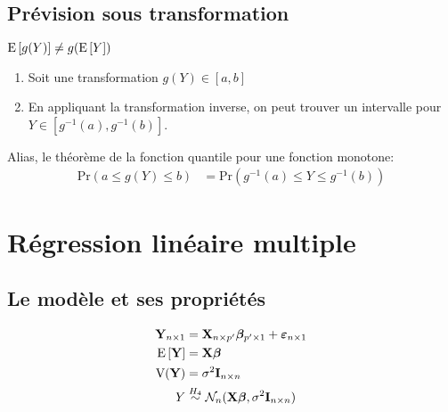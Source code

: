 \documentclass[10pt, french]{article}
\begin{document}
\begin{multicols*}{3}
\vfill\null
\subsection*{Prévision sous transformation}
$\mathrm{E} \left[ g(Y) \right] \not = g(\mathrm{E} \left[ Y \right])$
\begin{enumerate}
	\item[] Soit une transformation $g(Y) \in [a, b]$
	\item[] En appliquant la transformation inverse, on peut trouver un intervalle pour $Y\in [g^{-1}(a), g^{-1}(b)]$.
\end{enumerate}
Alias, le théorème de la fonction quantile pour une fonction monotone:
\begin{align*}
	\text{Pr}(a \le g(Y) \le b) &= \text{Pr}(g^{-1}(a) \le Y \le g^{-1}(b)) 
\end{align*}


\section{Régression linéaire multiple}
\subsection*{Le modèle et ses propriétés}
\begin{align*}
\mathbf{Y}_{n \times 1} &= \mathbf{X}_{n \times p'} \bm{\beta}_{p' \times 1} + \bm{\varepsilon}_{n \times 1} \\
\mathrm{E} \left[ \mathbf{Y} \right]	&= \mathbf{X} \bm{\beta} \\
\text{V}({\mathbf{Y}}) &= \sigma^2 \mathbf{I}_{n \times n} \\
Y &\overset{H_4}{\sim} \mathcal{N}_n(\mathbf{X} \bm{\beta}, \sigma^2 \mathbf{I}_{n \times n}) \\
\end{align*}


\end{multicols*}
\end{document}
